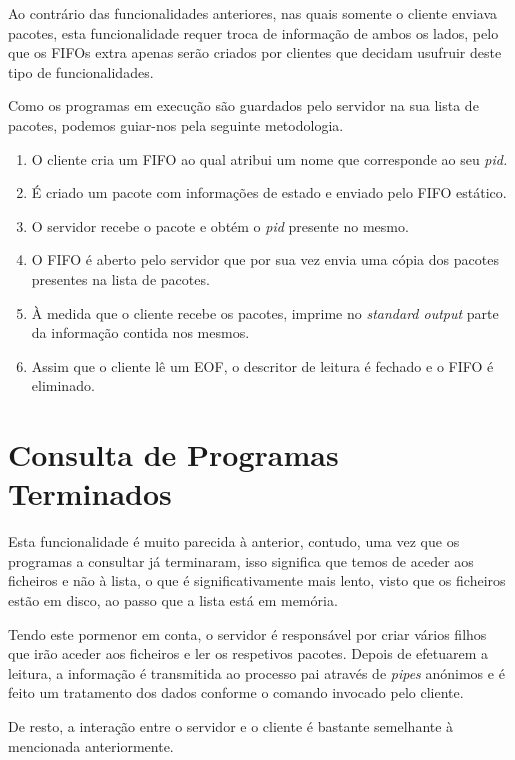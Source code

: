 \documentclass[12pt,a4paper]{report}
\begin{document}
        Ao contrário das funcionalidades anteriores, nas quais somente o cliente enviava pacotes, esta funcionalidade requer troca de informação de ambos os lados, pelo que os FIFOs extra apenas serão criados por clientes que decidam usufruir deste tipo de funcionalidades.

        Como os programas em execução são guardados pelo servidor na sua lista de pacotes, podemos guiar-nos pela seguinte metodologia.

        \begin{enumerate}
            \item O cliente cria um FIFO ao qual atribui um nome que corresponde ao seu \textit{pid.}
            \item É criado um pacote com informações de estado e enviado pelo FIFO estático.
            \item O servidor recebe o pacote e obtém o \textit{pid} presente no mesmo.
            \item O FIFO é aberto pelo servidor que por sua vez envia uma cópia dos pacotes presentes na lista de pacotes.
            \item À medida que o cliente recebe os pacotes, imprime no \textit{standard output} parte da informação contida nos mesmos.
            \item Assim que o cliente lê um EOF, o descritor de leitura é fechado e o FIFO é eliminado.
        \end{enumerate}

    \section{Consulta de Programas Terminados}

        Esta funcionalidade é muito parecida à anterior, contudo, uma vez que os programas a consultar já terminaram, isso significa que temos de aceder aos ficheiros e não à lista, o que é significativamente mais lento, visto que os ficheiros estão em disco, ao passo que a lista está em memória.

        Tendo este pormenor em conta, o servidor é responsável por criar vários filhos que irão aceder aos ficheiros e ler os respetivos pacotes. Depois de efetuarem a leitura, a informação é transmitida ao processo pai através de \textit{pipes} anónimos e é feito um tratamento dos dados conforme o comando invocado pelo cliente.

        De resto, a interação entre o servidor e o cliente é bastante semelhante à mencionada anteriormente.
\end{document}

